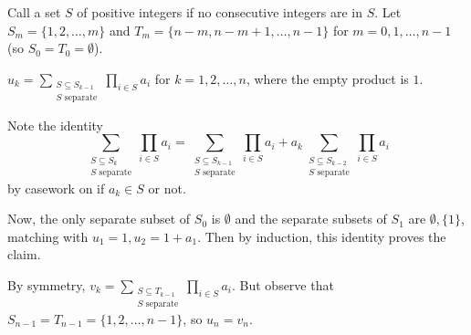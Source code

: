 Call a set $S$ of positive integers  if no consecutive integers are in $S$. Let $S_m=\{1,2,\ldots,m\}$ and $T_m=\{n-m,n-m+1,\ldots,n-1\}$ for $m=0,1,\ldots,n-1$ (so $S_0=T_0=\emptyset$).
\begin{claim}
	$u_k=\displaystyle\sum_{\substack{S\subseteq S_{k-1} \\ S\text{ separate}}}\displaystyle\prod_{i\in S}a_i$ for $k=1,2,\ldots,n$, where the empty product is $1$.
\end{claim}
\begin{lemmaproof}
	Note the identity
	\[
		\sum_{\substack{S\subseteq S_k \\ S\text{ separate}}}\prod_{i\in S}a_i=\sum_{\substack{S\subseteq S_{k-1} \\ S\text{ separate}}}\prod_{i\in S}a_i+a_k\sum_{\substack{S\subseteq S_{k-2} \\ S\text{ separate}}}\prod_{i\in S}a_i
	\]
	by casework on if $a_k\in S$ or not.
	
	Now, the only separate subset of $S_0$ is $\emptyset$ and the separate subsets of $S_1$ are $\emptyset,\{1\}$, matching with $u_1=1,u_2=1+a_1$. Then by induction, this identity proves the claim.
\end{lemmaproof}
By symmetry, $v_k=\displaystyle\sum_{\substack{S\subseteq T_{k-1} \\ S\text{ separate}}}\displaystyle\prod_{i\in S}a_i$. But observe that $S_{n-1}=T_{n-1}=\{1,2,\ldots,n-1\}$, so $u_n=v_n$.
